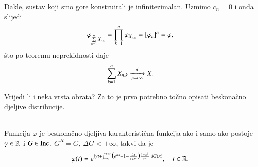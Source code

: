 Dakle, sustav koji smo gore konstruirali je infinitezimalan.
Uzmimo $c_n = 0$ i onda slijedi
\begin{equation*}
    \varphi_{\sum\limits_{k = 1}^{n} X_{n, k}} = \prod\limits_{k = 1}^{n} \varphi_{X_{n, k}} = [\varphi_n]^n = \varphi,
\end{equation*}
\v sto po teoremu neprekidnosti daje
\begin{equation}    \label{jed:20.15}
    \sum\limits_{k = 1}^{n} X_{n, k} \xrightarrow[n \to \infty]{d} X.
\end{equation}

Vrijedi li i neka vrsta obrata?
Za to je prvo potrebno to\v cno opisati beskona\v cno djeljive distribucije.

\begin{tm}   \label{tm:20.16}
    \quad \\
    Funkcija $\varphi$ je beskona\v cno djeljiva karakteristi\v cna funkcija ako i samo ako postoje $\gamma \in \mathbb{R}$ i $G \in \mathrm{Inc}$, $G^R = G$, $\Delta G < +\infty$, takvi da je
    \begin{equation*}
        \varphi (t) = e^{  i \gamma t + \int_{-\infty}^{+\infty} \big(e^{itx} - 1 - \frac{itx}{1 + t^2} \big) \frac{1 + x^2}{x^2}  \: d G(x)}, \quad t \in \mathbb{R}.
    \end{equation*}
\end{tm}

